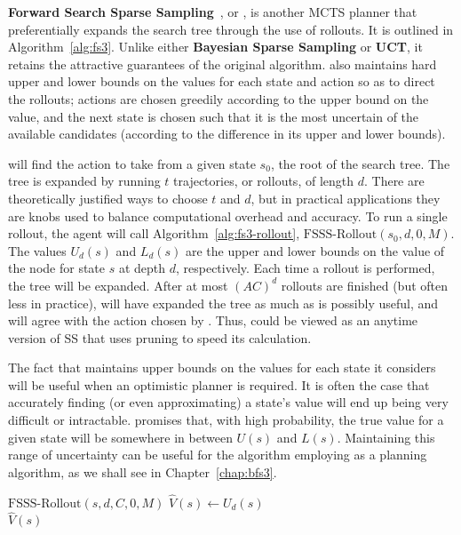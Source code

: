 \label{sec:rel:fsss}

{\bf Forward Search Sparse Sampling}~\cite{walsh10}, or , is another MCTS planner that preferentially expands the search tree through the use of rollouts. It is outlined in Algorithm~\ref{alg:fs3}. Unlike either {\bf Bayesian Sparse Sampling} or {\bf UCT}, it retains the attractive guarantees of the original  algorithm.  also maintains hard upper and lower bounds on the values for each state and action so as to direct the rollouts; actions are chosen greedily according to the upper bound on the value, and the next state is chosen such that it is the most uncertain of the available candidates (according to the difference in its upper and lower bounds).

 will find the action to take from a given state $s_0$, the root of the search tree.  The tree is expanded by running $t$ trajectories, or rollouts, of length $d$. There are theoretically justified ways to choose $t$ and $d$, but in practical applications they are knobs used to balance computational overhead and accuracy. To run a single rollout, the agent will call Algorithm~\ref{alg:fs3-rollout}, $\mbox{FSSS-Rollout}(s_0, d, 0, M)$.
The values $U_d(s)$ and $L_d(s)$ are the upper and lower bounds on the value of the node for state $s$ at depth $d$, respectively. Each time a rollout is performed, the tree will be expanded. After at most $(AC)^d$ rollouts are finished (but often less in practice),  will have expanded the tree as much as is possibly useful, and will agree with the action chosen by . Thus,  could be viewed as an anytime version of SS that uses pruning to speed its calculation.

The fact that  maintains upper bounds on the values for each state it considers will be useful when an optimistic planner is required. It is often the case that accurately finding (or even approximating) a state's value will end up being very difficult or intractable.  promises that, with high probability, the true value for a given state will be somewhere in between $U(s)$ and $L(s)$. Maintaining this range of uncertainty can be useful for the algorithm employing  as a planning algorithm, as we shall see in Chapter~\ref{chap:bfs3}.

\begin{algorithm}[tb]
	\caption{$\mbox{FSSS}(s, d, C, t, M)$}
	\label{alg:fs3}

	 {
		$\mbox{FSSS-Rollout}(s, d, C, 0, M)$
	}
	$\hat V(s) \leftarrow U_d(s)$\\
	\Return $\hat V(s)$
\end{algorithm}

